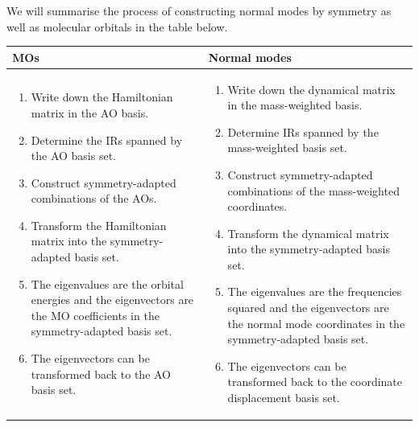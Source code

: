\documentclass{article}
\theoremstyle{plain}\theoremheaderfont{\normalfont\itshape}\theorembodyfont{\rmfamily}\theoremseparator{.}\newtheorem*{rem}{Remark}\newtheorem*{ex}{Example}\newtheorem*{proof}{Proof}\newtheorem*{altp}{Alternative proof}
\theoremstyle{plain}\theoremheaderfont{\normalfont\bfseries}\theorembodyfont{\rmfamily}\theoremseparator{.}\newtheorem{thm}{Theorem}[section]\newtheorem{lem}[thm]{Lemma}\newtheorem{prop}[thm]{Proposition}\newtheorem*{cor}{Corollary}\newtheorem{defn}[thm]{Definition}\newtheorem{clm}[thm]{Claim}\newtheorem{clminproof}{Claim}
\theoremstyle{break}\theoremheaderfont{\normalfont\itshape}\theorembodyfont{\rmfamily}\theoremseparator{.\medskip}\newtheorem*{proofskip}{Proof}\newtheorem*{exs}{Examples}\newtheorem*{rems}{Remarks}
\theoremstyle{break}\theoremheaderfont{\normalfont\bfseries}\theorembodyfont{\rmfamily}\theoremseparator{.\medskip}\newtheorem{lemskip}[thm]{Lemma}\newtheorem{defnskip}[thm]{Definition}\newtheorem{propskip}[thm]{Proposition}\newtheorem{thmskip}[thm]{Theorem}
\numberwithin{equation}{section}
\begin{document}
    We will summarise the process of constructing normal modes by symmetry as well as molecular orbitals in the table below.
    \begin{table}[ht!]
        \centering
        \begin{tabular}{p{7cm}p{7cm}}
            \toprule
            MOs & Normal modes \\ \midrule
            \begin{enumerate}[topsep=0pt]
                \item Write down the Hamiltonian matrix in the AO basis.
                \item Determine the IRs spanned by the AO basis set.
                \item Construct symmetry-adapted combinations of the AOs.
                \item Transform the Hamiltonian matrix into the symmetry-adapted basis set.
                \item The eigenvalues are the orbital energies and the eigenvectors are the MO coefficients in the symmetry-adapted basis set.
                \item The eigenvectors can be transformed back to the AO basis set.
            \end{enumerate}
            &
            \begin{enumerate}[topsep=0pt]
                \item Write down the dynamical matrix in the mass-weighted basis.
                \item Determine IRs spanned by the mass-weighted basis set.
                \item Construct symmetry-adapted combinations of the mass-weighted coordinates.
                \item Transform the dynamical matrix into the symmetry-adapted basis set.
                \item The eigenvalues are the frequencies squared and the eigenvectors are the normal mode coordinates in the symmetry-adapted basis set.
                \item The eigenvectors can be transformed back to the coordinate displacement basis set.
            \end{enumerate} \\ \bottomrule
        \end{tabular}
    \end{table}
\end{document}

